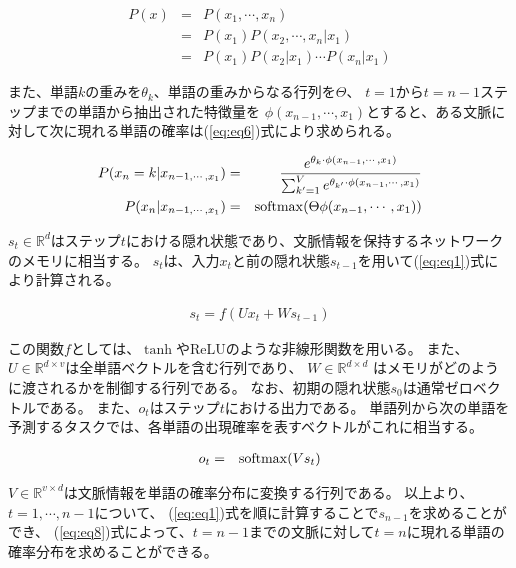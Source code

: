 \documentclass{jsarticle}
\begin{document}
\begin{eqnarray}
  \label{eq:eq2}
  P(x) &=& P(x_1,\cdots,x_n) \\
  \label{eq:eq3}
  &=& P(x_1)P(x_2,\cdots,x_n|x_1) \\
  \label{eq:eq4}
  &=& P(x_1)P(x_2|x_1)\cdots P(x_n|x_1)
\end{eqnarray}

また、単語$k$の重みを$\theta_k$、単語の重みからなる行列を$\Theta$、
$t=1$から$t=n-1$ステップまでの単語から抽出された特徴量を
$\phi(x_{n-1},\cdots,x_1)$とすると、ある文脈に対して次に現れる単語の確率は(\ref{eq:eq6})式により求められる。

\begin{eqnarray}
  \label{eq:eq5}
  P(x_n = k|x_{n-1,\cdots,x_1}) &=& \frac{e^{\theta_k\cdot \phi(x_{n-1},\cdots,x_1)}}{\sum_{k'=1}^V e^{\theta_{k'}\cdot \phi(x_{n-1},\cdots,x_1)}} \\
  \label{eq:eq6}
  P(x_n|x_{n-1,\cdots,x_1}) &=& {\rm softmax}(\Theta\phi(x_{n-1},\cdots,x_1))
\end{eqnarray}

$s_t \in \mathbb{R}^{d}$はステップ$t$における隠れ状態であり、文脈情報を保持するネットワークのメモリに相当する。
$s_t$は、入力$x_t$と前の隠れ状態$s_{t-1}$を用いて(\ref{eq:eq1})式により計算される。

\begin{eqnarray}
\label{eq:eq1}
s_t = f(Ux_t + Ws_{t-1})
\end{eqnarray}

この関数$f$としては、$\tanh$やReLUのような非線形関数を用いる。
また、$U \in \mathbb{R}^{d \times v} $は全単語ベクトルを含む行列であり、
$W \in \mathbb{R}^{d \times d}$ はメモリがどのように渡されるかを制御する行列である。
なお、初期の隠れ状態$s_{0}$は通常ゼロベクトルである。
また、$o_t$はステップ$t$における出力である。
単語列から次の単語を予測するタスクでは、各単語の出現確率を表すベクトルがこれに相当する。

\begin{eqnarray}
  \label{eq:eq7}
  o_t &=& {\rm softmax}(Vs_t)
\end{eqnarray}

$V \in \mathbb{R}^{v \times d}$は文脈情報を単語の確率分布に変換する行列である。
以上より、$t = 1,\cdots,n-1$について、 (\ref{eq:eq1})式を順に計算することで$s_{n-1}$を求めることができ、
(\ref{eq:eq8})式によって、$t=n-1$までの文脈に対して$t=n$に現れる単語の確率分布を求めることができる。
\end{document}
